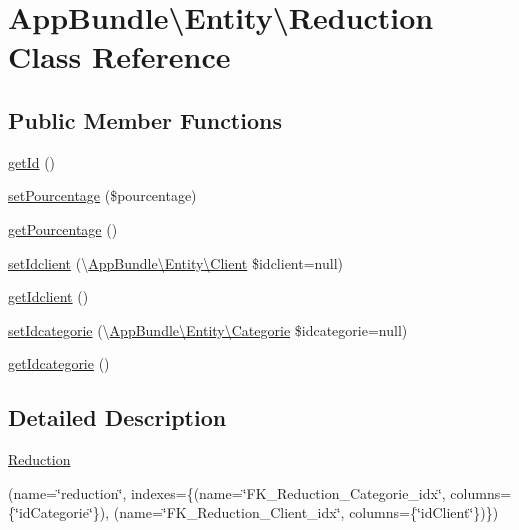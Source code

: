 \hypertarget{class_app_bundle_1_1_entity_1_1_reduction}{}\section{App\+Bundle\textbackslash{}Entity\textbackslash{}Reduction Class Reference}
\label{class_app_bundle_1_1_entity_1_1_reduction}
\subsection*{Public Member Functions}
\begin{DoxyCompactItemize}
\item 
\hyperlink{class_app_bundle_1_1_entity_1_1_reduction_ada92d61da5c7f616bcc45ea0bd43b8b6}{get\+Id} ()
\item 
\hyperlink{class_app_bundle_1_1_entity_1_1_reduction_ac355a83af78fbb7081912c9e2ef5be7f}{set\+Pourcentage} (\$pourcentage)
\item 
\hyperlink{class_app_bundle_1_1_entity_1_1_reduction_aad0adbb7e6a97279483bbdfe45ab60db}{get\+Pourcentage} ()
\item 
\hyperlink{class_app_bundle_1_1_entity_1_1_reduction_a67f4f6b6ac7199f97845e467653fe98a}{set\+Idclient} (\textbackslash{}\hyperlink{class_app_bundle_1_1_entity_1_1_client}{App\+Bundle\textbackslash{}\+Entity\textbackslash{}\+Client} \$idclient=null)
\item 
\hyperlink{class_app_bundle_1_1_entity_1_1_reduction_aa11bcae4c0faee912ad74a3e566b53b1}{get\+Idclient} ()
\item 
\hyperlink{class_app_bundle_1_1_entity_1_1_reduction_a67708616e74e2c019404f1343f65f9df}{set\+Idcategorie} (\textbackslash{}\hyperlink{class_app_bundle_1_1_entity_1_1_categorie}{App\+Bundle\textbackslash{}\+Entity\textbackslash{}\+Categorie} \$idcategorie=null)
\item 
\hyperlink{class_app_bundle_1_1_entity_1_1_reduction_a79f78f1f6eec843d5de75df1a42b1019}{get\+Idcategorie} ()
\end{DoxyCompactItemize}


\subsection{Detailed Description}
\hyperlink{class_app_bundle_1_1_entity_1_1_reduction}{Reduction}

(name=\char`\"{}reduction\char`\"{}, indexes=\{(name=\char`\"{}\+F\+K\+\_\+\+Reduction\+\_\+\+Categorie\+\_\+idx\char`\"{}, columns=\{\char`\"{}id\+Categorie\char`\"{}\}), (name=\char`\"{}\+F\+K\+\_\+\+Reduction\+\_\+\+Client\+\_\+idx\char`\"{}, columns=\{\char`\"{}id\+Client\char`\"{}\})\})  


